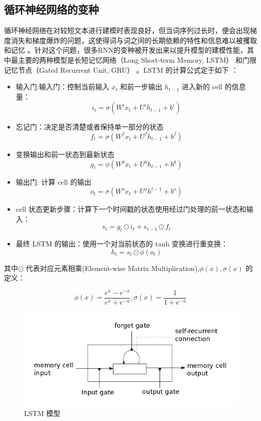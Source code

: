 \documentclass[12pt,a4paper]{article}
\begin{document}
\subsection{循环神经网络的变种}
循环神经网络在对较短文本进行建模时表现良好，但当词序列过长时，便会出现梯度消失和梯度爆炸的问题，这使得词与词之间的长期依赖的特性和信息难以被攫取和记忆 \cite{DBLP:journals/tnn/BengioSF94}。针对这个问题，很多RNN的变种被开发出来以提升模型的建模性能，其中最主要的两种模型是长短记忆网络（Long Short-term Memory, LSTM） \cite{DBLP:conf/interspeech/SundermeyerSN12} 和门限记忆节点（Gated Recurrent Unit, GRU） \cite{DBLP:conf/nips/ChungKDGCB15}。LSTM 的计算公式定于如下 \cite{DBLP:journals/neco/HochreiterS97}：
\begin{itemize}
\item 输入门:输入门：控制当前输入 $x_t$ 和前一步输出 $h_{t−1}$ 进入新的 cell 的信息量：
$$i_t=\sigma(W^i x_t+U^i h_{t-1}+b^i)$$
\item  忘记门：决定是否清楚或者保持单一部分的状态
$$f_t=\sigma(W^f x_t+U^f h_{t-1}+b^f)$$
\item  变换输出和前一状态到最新状态
$$g_t=\phi(W^g x_t+U^g h_{t-1}+b^g)$$
\item  输出门: 计算 cell 的输出
$$o_t=\sigma(W^o x_t+U^o h^{t-1}+b^o)$$
\item  cell 状态更新步骤：计算下一个时间戳的状态使用经过门处理的前一状态和输入：
$$s_t=g_t\odot i_t+s_{t-1}\odot f_t$$
\item  最终 LSTM 的输出：使用一个对当前状态的 tanh 变换进行重变换：
$$h_t=s_t\odot \phi(o_t)$$
\end{itemize}
其中$\odot$ 代表对应元素相乘(Element-wise Matrix Multiplication),$\phi(x), \sigma(x)$ 的定义：

\begin{equation}\label{equ:tanh}
  \phi(x)=\frac{e^x-e^{-x}}{e^x+e^{-x}},\sigma(x)=\frac{1}{1+e^{-x}}
\end{equation}

\begin{figure}
  \centering
  \includegraphics[width=0.9\linewidth]{./figures/lstm_memorycell.png}
  \caption{LSTM 模型}\label{fig:lstm}
\end{figure}
\end{document}
